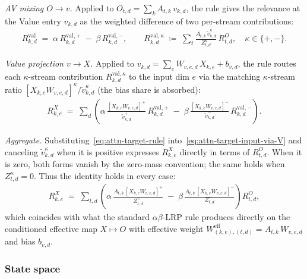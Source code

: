\documentclass[twoside]{article}
\newcommand{\1}{\mathbf{1}}
\begin{document}
\emph{AV mixing $O \to v$.} Applied to $O_{t,d} = \sum_k A_{t,k}\,v_{k,d}$, the rule gives the
relevance at the Value entry $v_{k,d}$ as the weighted difference of two per-stream contributions:
\begin{align}\label{eq:attn-target-rule}
    R^{\mathrm{val}}_{k,d} \;=\; \alpha\,R^{\mathrm{val},+}_{k,d} \;-\;
    \beta\,R^{\mathrm{val},-}_{k,d},
    \qquad
    R^{\mathrm{val},\kappa}_{k,d} \;\coloneqq\; \sum_t \frac{A_{t,k}\,\tilde
    v_{k,d}^\kappa}{Z_{t,d}^\kappa}\,R^O_{t,d},
    \quad \kappa \in \{+,-\}.
\end{align}

\emph{Value projection $v \to X$.} Applied to $v_{k,d} = \sum_e W_{v,e,d}\,X_{k,e} + b_{v,d}$, the
rule routes each $\kappa$-stream contribution $R^{\mathrm{val},\kappa}_{k,d}$ to the input dim $e$
via the matching $\kappa$-stream ratio $[X_{k,e}W_{v,e,d}]^\kappa/\tilde v_{k,d}^\kappa$ (the bias
share is absorbed):
\begin{align}\label{eq:attn-target-input-via-V}
    R^X_{k,e} \;=\; \sum_d \left(
    \alpha\, \frac{[X_{k,e} W_{v,e,d}]^+}{\tilde v_{k,d}^+}\,R^{\mathrm{val},+}_{k,d}
    \;-\;
    \beta\, \frac{[X_{k,e} W_{v,e,d}]^-}{\tilde v_{k,d}^-}\,R^{\mathrm{val},-}_{k,d}
    \right).
\end{align}

\emph{Aggregate.} Substituting~\eqref{eq:attn-target-rule} into~\eqref{eq:attn-target-input-via-V}
and canceling $\tilde v_{k,d}^\kappa$ when it is positive expresses $R^X_{k,e}$ directly
in terms of $R^O_{t,d}$. When it is zero, both forms vanish by the zero-mass convention;
the same holds when $Z_{t,d}^\kappa=0$. Thus the identity holds in every case:
\begin{align}\label{eq:attn-target-input}
    R^X_{k,e}
    \;=\; \sum_{t,d} \left(
    \alpha\, \frac{A_{t,k}\, [X_{k,e} W_{v,e,d}]^+}{Z_{t,d}^+}
    \;-\;
    \beta\, \frac{A_{t,k}\, [X_{k,e} W_{v,e,d}]^-}{Z_{t,d}^-}
    \right) R^O_{t,d},
\end{align}
which coincides with what the standard $\alpha\beta$-\ac{LRP} rule produces directly on the
conditioned effective map $X \mapsto O$ with effective weight $W^{\mathrm{eff}}_{(k,e),(t,d)} =
    A_{t,k}\,W_{v,e,d}$ and bias $b_{v,d}$.

\subsubsection{State space}\label{app:attention-state-space}
\end{document}
